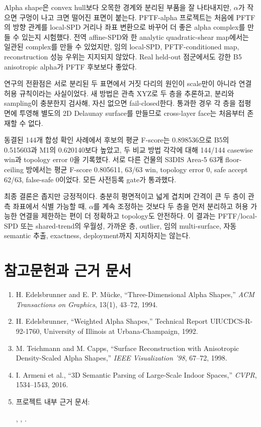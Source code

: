 \documentclass[11pt,a4paper]{article}
\begin{document}
Alpha shape은 convex hull보다 오목한 경계와 분리된 부품을 잘 나타내지만,
$\alpha$가 작으면 구멍이 나고 크면 떨어진 표면이 붙는다. PFTF-alpha 프로젝트는
처음에 PFTF의 방향 관계를 local-SPD 거리나 좌표 변환으로 바꾸어 더 좋은
alpha complex를 만들 수 있는지 시험했다. 전역 affine-SPD와 한 analytic
quadratic-shear map에서는 일관된 complex를 만들 수 있었지만, 임의 local-SPD,
PFTF-conditioned map, reconstruction 성능 우위는 지지되지 않았다. Real held-out
점군에서도 강한 B5 anisotropic alpha가 PFTF 후보보다 좋았다.

연구의 전환점은 서로 분리된 두 표면에서 거짓 다리의 원인이 scale만이 아니라
연결 허용 규칙이라는 사실이었다. 새 방법은 관측 XYZ로 두 층을 추론하고,
분리와 sampling이 충분한지 검사해, 자신 없으면 fail-closed한다. 통과한 경우
각 층을 접평면에 투영해 별도의 2D Delaunay surface를 만들므로 cross-layer
face는 처음부터 존재할 수 없다.

동결된 144개 합성 확인 사례에서 후보의 평균 F-score는 0.898536으로 B5의
0.515603과 M1의 0.620140보다 높았고, 두 비교 방법 각각에 대해 144/144
casewise win과 topology error 0을 기록했다. 서로 다른 건물의 S3DIS Area-5
63개 floor-ceiling 방에서는 평균 F-score 0.805611, 63/63 win, topology error
0, safe accept 62/63, false-safe 0이었다. 모든 사전등록 gate가 통과했다.

최종 결론은 좁지만 긍정적이다. 충분히 평면적이고 넓게 겹치며 간격이 큰 두 층이
관측 좌표에서 식별 가능할 때, $\alpha$를 계속 조정하는 것보다 두 층을 먼저
분리하고 허용 가능한 연결을 제한하는 편이 더 정확하고 topology도 안전하다.
이 결과는 PFTF/local-SPD 또는 shared-trend의 우월성, 가까운 층, outlier,
임의 multi-surface, 자동 semantic 추출, exactness, deployment까지 지지하지는
않는다.

\section*{참고문헌과 근거 문서}

\begin{enumerate}
  \item H. Edelsbrunner and E. P. M\"ucke, ``Three-Dimensional Alpha
  Shapes,'' \emph{ACM Transactions on Graphics}, 13(1), 43--72, 1994.
  \item H. Edelsbrunner, ``Weighted Alpha Shapes,'' Technical Report
  UIUCDCS-R-92-1760, University of Illinois at Urbana-Champaign, 1992.
  \item M. Teichmann and M. Capps, ``Surface Reconstruction with Anisotropic
  Density-Scaled Alpha Shapes,'' \emph{IEEE Visualization '98}, 67--72, 1998.
  \item I. Armeni et al., ``3D Semantic Parsing of Large-Scale Indoor
  Spaces,'' \emph{CVPR}, 1534--1543, 2016.
  \item 프로젝트 내부 근거 문서:
  \par
  ,
  ,
  .
\end{enumerate}
\end{document}
